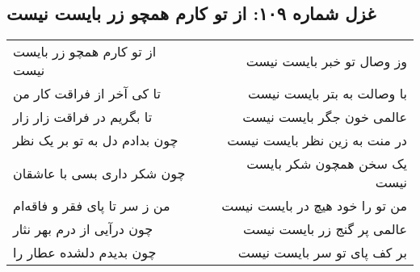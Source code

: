 \begin{center}
\section*{غزل شماره ۱۰۹: از تو کارم همچو زر بایست نیست}
\label{sec:109}
\begin{longtable}{l p{0.5cm} r}
از تو کارم همچو زر بایست نیست
&&
وز وصال تو خبر بایست نیست
\\
تا کی آخر از فراقت کار من
&&
با وصالت به بتر بایست نیست
\\
تا بگریم در فراقت زار زار
&&
عالمی خون جگر بایست نیست
\\
چون بدادم دل به تو بر یک نظر
&&
در منت به زین نظر بایست نیست
\\
چون شکر داری بسی با عاشقان
&&
یک سخن همچون شکر بایست نیست
\\
من ز سر تا پای فقر و فاقه‌ام
&&
من تو را خود هیچ در بایست نیست
\\
چون درآیی از درم بهر نثار
&&
عالمی پر گنج زر بایست نیست
\\
چون بدیدم دلشده عطار را
&&
بر کف پای تو سر بایست نیست
\\
\end{longtable}
\end{center}
